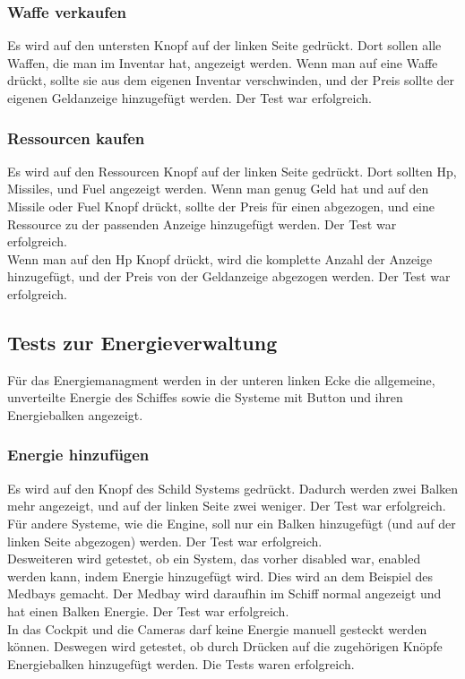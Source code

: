 \documentclass[fontsize=12pt,paper=a4,twoside]{scrartcl}
\begin{document}
\subsubsection{Waffe verkaufen}
Es wird auf den untersten Knopf auf der linken Seite gedrückt. Dort sollen alle Waffen, die man im Inventar hat, angezeigt werden. Wenn man auf eine Waffe drückt, sollte sie aus dem eigenen Inventar verschwinden, und der Preis sollte der eigenen Geldanzeige hinzugefügt werden.  Der Test war erfolgreich. \\
\subsubsection{Ressourcen kaufen}
Es wird auf den Ressourcen Knopf auf der linken Seite gedrückt. Dort sollten Hp, Missiles, und Fuel angezeigt werden. Wenn man genug Geld hat und auf den Missile oder Fuel Knopf drückt, sollte der Preis für einen abgezogen, und eine Ressource zu der passenden Anzeige hinzugefügt werden.  Der Test war erfolgreich. \\
Wenn man auf den Hp Knopf drückt, wird die komplette Anzahl der Anzeige hinzugefügt, und der Preis von der Geldanzeige abgezogen werden.  Der Test war erfolgreich. \\
\subsection{Tests zur Energieverwaltung}
Für das Energiemanagment werden in der unteren linken Ecke die allgemeine, unverteilte Energie des Schiffes sowie die Systeme mit Button und ihren Energiebalken angezeigt. \\
\subsubsection{Energie hinzufügen}
Es wird auf den Knopf des Schild Systems gedrückt. Dadurch werden zwei Balken mehr angezeigt, und auf der linken Seite zwei weniger. Der Test war erfolgreich. \\
Für andere Systeme, wie die Engine, soll nur ein Balken hinzugefügt (und auf der linken Seite abgezogen) werden. Der Test war erfolgreich. \\
Desweiteren wird getestet, ob ein System, das vorher disabled war, enabled werden kann, indem Energie hinzugefügt wird. Dies wird an dem Beispiel des Medbays gemacht. Der Medbay wird daraufhin im Schiff normal angezeigt und hat einen Balken Energie. Der Test war erfolgreich. \\
In das Cockpit und die Cameras darf keine Energie manuell gesteckt werden können. Deswegen wird getestet, ob durch Drücken auf die zugehörigen Knöpfe Energiebalken hinzugefügt werden. Die Tests waren erfolgreich. \\
\end{document}

